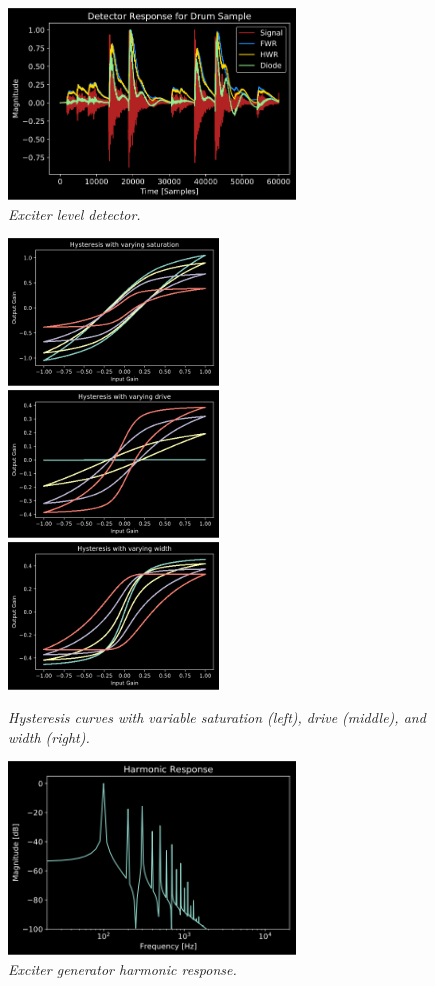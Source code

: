 \documentclass[twoside,a4paper]{article}
\begin{document}
%
\begin{figure}[h]
    \center
    \includegraphics[width=3in]{../Exciter/Pics/Waveform_Detected.png}
    \caption{\label{detect}{\it Exciter level detector.}}
\end{figure}
%
\begin{figure}[ht]
    \includegraphics[width=2.2in]{../Hysteresis/Pics/Saturations.png}
    \includegraphics[width=2.2in]{../Hysteresis/Pics/Drive.png}
    \includegraphics[width=2.2in]{../Hysteresis/Pics/Width.png}
    \caption{\label{hysteresis}{\it Hysteresis curves with variable saturation
    (left), drive (middle), and width (right).}}
\end{figure}
%
\begin{figure}[h]
    \center
    \includegraphics[width=3in]{../Exciter/Pics/exciter_harm.png}
    \caption{\label{exc-harm}{\it Exciter generator harmonic response.}}
\end{figure}
%
\end{document}
